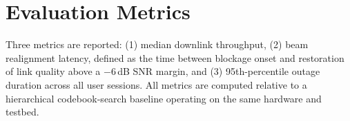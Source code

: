 \section{Evaluation Metrics}
Three metrics are reported: (1) median downlink throughput, (2) beam
realignment latency, defined as the time between blockage onset and
restoration of link quality above a $-6$\,dB SNR margin, and (3)
95th-percentile outage duration across all user sessions. All metrics are
computed relative to a hierarchical codebook-search baseline operating on the
same hardware and testbed.

